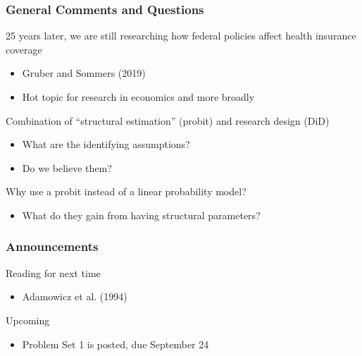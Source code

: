 \documentclass{beamer}\usepackage[]{graphicx}\usepackage[]{color}
\begin{document}
\begin{frame}\frametitle{General Comments and Questions}
    25 years later, we are still researching how federal policies affect health insurance coverage
    \begin{itemize}
    	\item Gruber and Sommers (2019)
    	\item Hot topic for research in economics and more broadly
    \end{itemize}
    \vspace{2ex}
    Combination of ``structural estimation'' (probit) and research design (DiD)
    \begin{itemize}
    	\item What are the identifying assumptions?
    	\item Do we believe them?
    \end{itemize}
    \vspace{2ex}
    Why use a probit instead of a linear probability model?
    \begin{itemize}
    	\item What do they gain from having structural parameters?
    \end{itemize}
\end{frame}

\begin{frame}\frametitle{Announcements}
    Reading for next time
    \begin{itemize}
        \item Adamowicz et al. (1994)
    \end{itemize}
    \vspace{3ex}
    Upcoming
    \begin{itemize}
        \item Problem Set 1 is posted, due September 24
    \end{itemize}
\end{frame}
\end{document}
